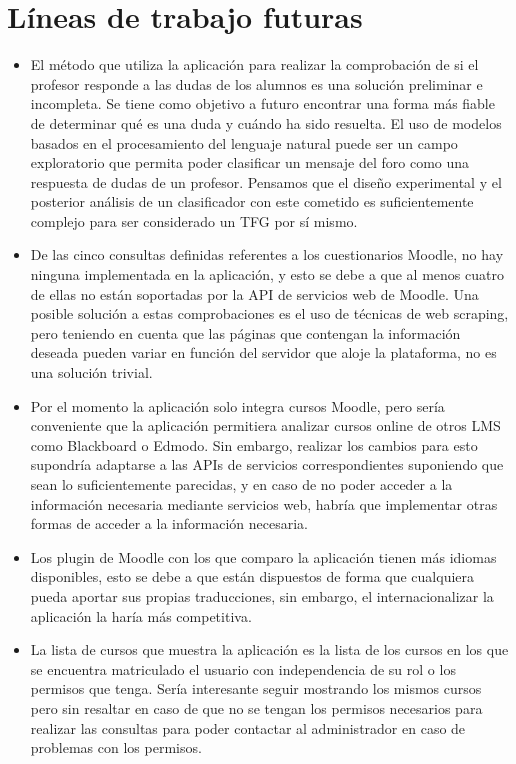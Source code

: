
\section{Líneas de trabajo futuras}
\begin{itemize}
	\item
	El método que utiliza la aplicación para realizar la comprobación de si el profesor responde a las dudas de los alumnos es una solución preliminar e incompleta. Se tiene como objetivo a futuro encontrar una forma más fiable de determinar qué es una duda y cuándo ha sido resuelta.
	El uso de modelos basados en el procesamiento del lenguaje natural puede ser un campo exploratorio que permita poder clasificar un mensaje del foro como una respuesta de dudas de un profesor. Pensamos que el diseño experimental y el posterior análisis de un clasificador con este cometido es suficientemente complejo para ser considerado un TFG por sí mismo.
	\item
	De las cinco consultas definidas referentes a los cuestionarios Moodle, no hay ninguna implementada en la aplicación, y esto se debe a que al menos cuatro de ellas no están soportadas por la API de servicios web de Moodle.
	Una posible solución a estas comprobaciones es el uso de técnicas de web scraping, pero teniendo en cuenta que las páginas que contengan la información deseada pueden variar en función del servidor que aloje la plataforma, no es una solución trivial.
	\item
	Por el momento la aplicación solo integra cursos Moodle, pero sería conveniente que la aplicación permitiera analizar cursos online de otros LMS como Blackboard o Edmodo. Sin embargo, realizar los cambios para esto supondría adaptarse a las APIs de servicios correspondientes suponiendo que sean lo suficientemente parecidas, y en caso de no poder acceder a la información necesaria mediante servicios web, habría que implementar otras formas de acceder a la información necesaria.
	\item
	Los plugin de Moodle con los que comparo la aplicación tienen más idiomas disponibles, esto se debe a que están dispuestos de forma que cualquiera pueda aportar sus propias traducciones, sin embargo, el internacionalizar la aplicación la haría más competitiva.
	\item
	La lista de cursos que muestra la aplicación es la lista de los cursos en los que se encuentra matriculado el usuario con independencia de su rol o los permisos que tenga. Sería interesante seguir mostrando los mismos cursos pero sin resaltar en caso de que no se tengan los permisos necesarios para realizar las consultas para poder contactar al administrador en caso de problemas con los permisos.

\end{itemize}
